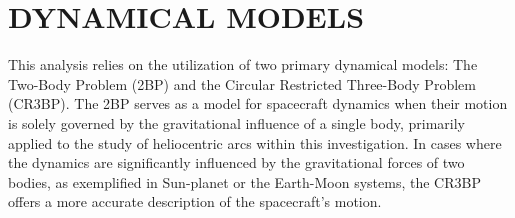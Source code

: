 \chapter{DYNAMICAL MODELS}

This analysis relies on the utilization of two primary dynamical models: The Two-Body Problem (2BP)
and the Circular Restricted Three-Body Problem (CR3BP). The 2BP serves as a model for spacecraft
dynamics when their motion is solely governed by the gravitational influence of a single body,
primarily applied to the study of heliocentric arcs within this investigation. In cases where the
dynamics are significantly influenced by the gravitational forces of two bodies, as exemplified in
Sun-planet or the Earth-Moon systems, the CR3BP offers a more accurate description of the
spacecraft's motion.







